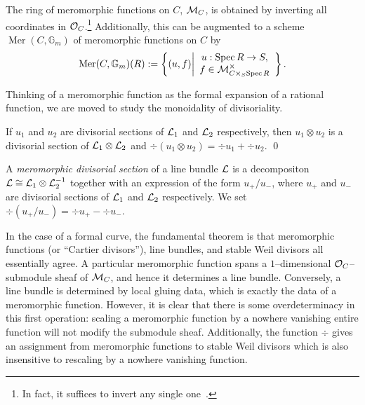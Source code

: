 \begin{definition}
The ring of meromorphic functions on $C$, $\mathcal{M}_C$, is obtained by inverting all coordinates in $\mathcal{O}_C$.\footnote{In fact, it suffices to invert any single one~\cite[Lemma 5.21]{StricklandFSFG}.}  Additionally, this can be augmented to a scheme $\operatorname{Mer}(C, \mathbb G_m)$ of meromorphic functions on $C$ by \[\operatorname{Mer}(C, \mathbb G_m)(R) := \left\{ (u, f) \middle| \begin{array}{c} u: \operatorname{Spec} R \to S, \\ f \in \mathcal{M}^\times_{C \times_S \operatorname{Spec} R} \end{array} \right\}.\]
\end{definition}

Thinking of a meromorphic function as the formal expansion of a rational function, we are moved to study the monoidality of divisoriality.

\begin{lemma}
If $u_1$ and $u_2$ are divisorial sections of $\mathcal{L}_1$ and $\mathcal{L}_2$ respectively, then $u_1 \otimes u_2$ is a divisorial section of $\mathcal{L}_1 \otimes \mathcal{L}_2$ and $\div(u_1 \otimes u_2) = \div u_1 + \div u_2$. \qed
\end{lemma}

\begin{definition}
A \textit{meromorphic divisorial section} of a line bundle $\mathcal{L}$ is a decompositon $\mathcal{L} \cong \mathcal{L}_1 \otimes \mathcal{L}_2^{-1}$ together with an expression of the form $u_+ / u_-$, where $u_+$ and $u_-$ are divisorial sections of $\mathcal{L}_1$ and $\mathcal{L}_2$ respectively.  We set $\div(u_+ / u_-) = \div u_+ - \div u_-$.
\end{definition}

In the case of a formal curve, the fundamental theorem is that meromorphic functions (or ``Cartier divisors''), line bundles, and stable Weil divisors all essentially agree.  A particular meromorphic function spans a $1$--dimensional $\mathcal{O}_C$--submodule sheaf of $\mathcal{M}_C$, and hence it determines a line bundle.  Conversely, a line bundle is determined by local gluing data, which is exactly the data of a meromorphic function.  However, it is clear that there is some overdeterminacy in this first operation: scaling a meromorphic function by a nowhere vanishing entire function will not modify the submodule sheaf.  Additionally, the function $\div$ gives an assignment from meromorphic functions to stable Weil divisors which is also insensitive to rescaling by a nowhere vanishing function.

